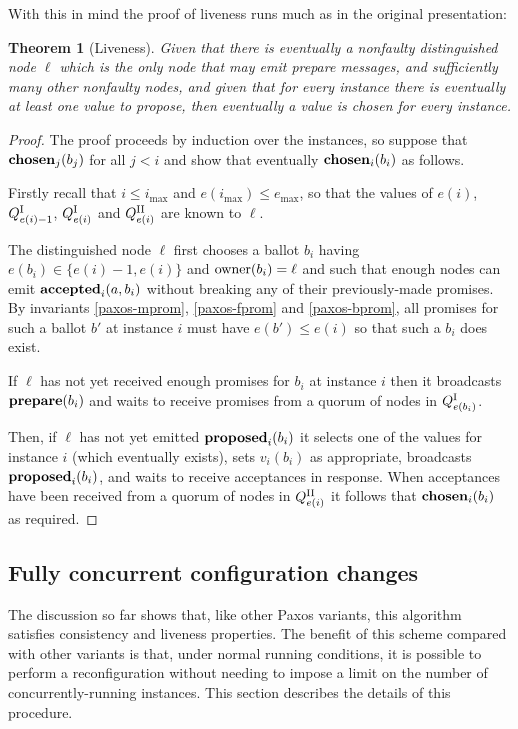 \documentclass[journal]{IEEEtran}
\newtheorem{theorem}{Theorem}
\begin{document}
With this in mind the proof of liveness runs much as in the original
presentation:

\begin{theorem}[Liveness]\label{liveness-theorem} Given that there is
  eventually a nonfaulty distinguished node $\ell$ which is the only node that
  may emit prepare messages, and sufficiently many other nonfaulty nodes, and
  given that for every instance there is eventually at least one value to
propose, then eventually a value is chosen for every instance.  \end{theorem}

\begin{proof} The proof proceeds by induction over the instances, so suppose
that $\mathbf{chosen}_{j}(b_j)$ for all $j < i$ and show that eventually
$\mathbf{chosen}_{i}(b_i)$ as follows.

Firstly recall that $i \le i_{\mathrm{max}}$ and $e(i_{\mathrm{max}}) \le
e_{\mathrm{max}}$, so that the values of $e(i)$, ${Q}^\textrm{I}_{e(i)-1}$, ${Q}^\textrm{I}_{e(i)}$ and
${Q}^\textrm{II}_{e(i)}$ are known to $\ell$.

The distinguished node $\ell$ first chooses a ballot $b_i$ having $e(b_i) \in
\{ e(i) - 1, e(i) \}$ and $\mathrm{owner}(b_i) = \ell$ and such that enough nodes can
emit $\mathbf{accepted}_{i}(a,b_i)$ without breaking any of their previously-made promises.
By invariants \ref{paxos-mprom}, \ref{paxos-fprom} and \ref{paxos-bprom}, all
promises for such a ballot $b'$ at instance $i$ must have $e(b') \le e(i)$ so
that such a $b_i$ does exist.

If $\ell$ has not yet received enough promises for $b_i$ at instance $i$ then
it broadcasts $\mathbf{prepare}(b_i)$ and waits to receive promises from a quorum of nodes
in ${Q}^\textrm{I}_{e(b_i)}$.

Then, if $\ell$ has not yet emitted $\mathbf{proposed}_{i}(b_i)$ it selects one of the
values for instance $i$ (which eventually exists), sets $v_i(b_i)$ as
appropriate, broadcasts $\mathbf{proposed}_{i}(b_i)$, and waits to receive acceptances in
response. When acceptances have been received from a quorum of nodes in
${Q}^\textrm{II}_{e(i)}$ it follows that $\mathbf{chosen}_{i}(b_i)$ as required. \end{proof}

\subsection{Fully concurrent configuration changes}\label{fully-concurrent}

The discussion so far shows that, like other Paxos variants, this algorithm
satisfies consistency and liveness properties.  The benefit of this scheme
compared with other variants is that, under normal running conditions, it is
possible to perform a reconfiguration without needing to impose a limit on the
number of concurrently-running instances. This section describes the details of
this procedure.
\end{document}
